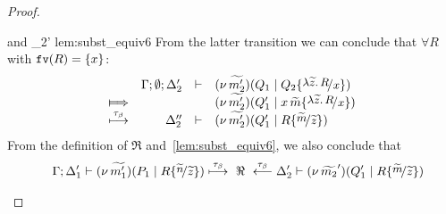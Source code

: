 \begin{proof}
\begin{enumerate}
%
	\noi and
%
	{\hwb}
	{\Delta_2'}{}
	{lem:subst_equiv6}
%
%
%
	\noi From the latter transition we can conclude that $\forall R$ with $\mathtt{fv}(R) = \{x\}$:
%
	\[
		\begin{array}{crll}
			&\Gamma; \es; \Delta_2'& \proves & 
			\newsp{\widetilde{m_2'}}{Q_1 \Par Q_2 \subst{\abs{\widetilde{z}}{R}}{x}}\\
			\Hby{} & & &
			\newsp{\widetilde{m_2'}}{Q_1' \Par \appl{x}{\widetilde{m}} \subst{\abs{\widetilde{z}}{R}}{x}} \\
			\hby{\btau}
			&\Delta_2''& \proves & \newsp{\widetilde{m_2'}}{Q_1' \Par R \subst{\widetilde{m}}{\widetilde{z}}}%
		\end{array}
	\]
%
%
	\noi From the definition of $\Re$ and~\eqref{lem:subst_equiv6},
	we also conclude that
	\begin{eqnarray*}
		&& \horel{\Gamma}
		{\Delta_1'}{\newsp{\widetilde{m_1'}}{P_1 \Par R 
\subst{\widetilde{n}}{\widetilde{z}}}}
		{\hby{\btau}\ \Re\ \stackrel{\btau}{\longleftarrow}}
		{\Delta_2'}{\newsp{\widetilde{m_2}'}{Q_1' \Par R \subst{\widetilde{m}}{\widetilde{z}}}}

\end{eqnarray*}
\end{enumerate}
\end{proof}
